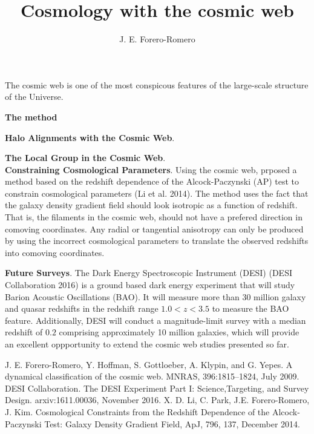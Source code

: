 \documentclass[preprint,proceedings]{rmaa}
\title{Cosmology with the cosmic web}
\author{J. E. Forero-Romero\altaffilmark{1}}
\begin{document}
\maketitle 



The cosmic web is one of the most conspicous features of the
large-scale structure of the Universe. 

{\bf The method}

{\bf Halo Alignments with the Cosmic Web}. 

{\bf The Local Group in the Cosmic Web}.\\

{\bf Constraining Cosmological Parameters}. Using the cosmic web, 
prposed a method based on the redshift dependence of the
Alcock-Paczynski (AP) test to constrain cosmological parameters (Li et
al. 2014). 
The method uses the fact that the galaxy density gradient field should
look isotropic as a function of redshift. That is, the filaments in
the cosmic web, should not have a prefered direction in comoving coordinates. Any radial or
tangential anisotropy can only be produced by using the incorrect
cosmological parameters to translate the observed redshifts into
comoving coordinates.


{\bf Future Surveys}. The Dark Energy Spectroscopic Instrument (DESI) (DESI Collaboration
2016) is a ground based dark
energy experiment that will study Barion Acoustic Oscillations (BAO). 
It will measure more than 30 million galaxy and quasar redshifts in
the redshift range $1.0<z<3.5$ to measure the BAO feature.
Additionally, DESI will conduct a magnitude-limit survey with a median
redshift of $0.2$ comprising approximately 10 million galaxies, which
will provide an excellent oppportunity to extend the cosmic web
studies presented so far.



\begin{thebibliography}

 
 J. E. Forero-Romero, Y. Hoffman, S. Gottloeber, A. Klypin, and G. Yepes. A dynamical classification of the cosmic web. MNRAS, 396:1815–1824, July 2009.
 DESI Collaboration. The DESI Experiment Part I:
  Science,Targeting, and Survey Design. arxiv:1611.00036, November 2016.  
 X. D. {Li}, C. {Park}, J.E. {Forero-Romero}, J. {Kim}.
  {Cosmological Constraints from the Redshift Dependence of
  the Alcock-Paczynski Test: Galaxy Density Gradient Field},
  ApJ, 796, 137, December 2014. 
\end{thebibliography} 
\end{document}
